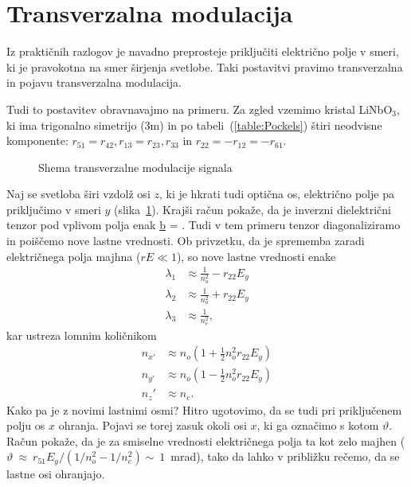 \section{Transverzalna modulacija}
Iz praktičnih razlogov je navadno preprosteje priključiti električno polje v smeri, ki 
je pravokotna na smer širjenja svetlobe. Taki postavitvi pravimo transverzalna in pojavu
transverzalna modulacija.

Tudi to postavitev obravnavajmo na primeru. Za zgled vzemimo kristal LiNbO$_3$, ki 
ima trigonalno simetrijo (3m) in po tabeli~(\ref{table:Pockels}) štiri 
neodvisne komponente: $r_{51}=r_{42}, r_{13}=r_{23}, r_{33}$ in $r_{22}=-r_{12}=-r_{61}$.

\begin{figure}[h]
\centering
\def\svgwidth{80truemm} 

\caption{Shema transverzalne modulacije signala}
\label{fig:tmshema}
\end{figure}
\pagebreak
Naj se svetloba širi vzdolž osi $z$, ki je hkrati tudi optična os, 
električno polje pa priključimo v smeri $y$ (slika~\ref{fig:tmshema}). 
Krajši račun pokaže, da je inverzni dielektrični tenzor pod vplivom polja enak
\beq
\underline{b} = 
 .
\label{7.8b}
\eeq
Tudi v tem primeru tenzor diagonaliziramo in poiščemo nove lastne vrednosti.
Ob privzetku, da je sprememba zaradi električnega polja majhna ($rE\ll1$),
so nove lastne vrednosti enake
\begin{align}
\lambda_1 &\approx \frac{1}{n_o^2}-r_{22}E_y \\
\lambda_2 &\approx \frac{1}{n_o^2}+ r_{22}E_y \\
\lambda_3 &\approx \frac{1}{n_e^2},
\end{align}
kar ustreza lomnim količnikom 
\begin{align}
n_{x'} &\approx n_o(1+\frac{1}{2}n_o^2r_{22}E_y)\\
n_{y'} &\approx n_o(1-\frac{1}{2}n_o^2r_{22}E_y)\\
n_z' &\approx n_e.
\end{align}
Kako pa je z novimi lastnimi osmi? Hitro ugotovimo, da se tudi pri 
priključenem polju os $x$ ohranja. Pojavi se torej zasuk okoli osi $x$,
ki ga označimo s kotom $\vartheta$. Račun pokaže, da je za smiselne
vrednosti električnega polja ta kot zelo majhen ($\vartheta~
\approx~r_{51}E_y/(1/n_o^2-1/n_e^2) \sim~1$~mrad),
tako da lahko v približku rečemo, da se lastne osi ohranjajo. 

